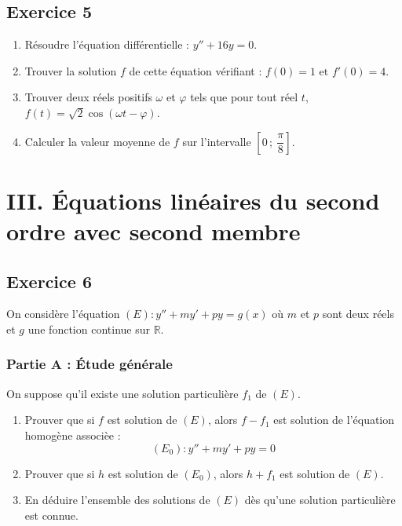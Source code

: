 \documentclass[12pt,a4paper]{article}
\begin{document}
\subsection*{Exercice 5}
\begin{enumerate}
    \item Résoudre l'équation différentielle : $y'' + 16y = 0.$
    \item Trouver la solution $f$ de cette équation vérifiant : $f(0) = 1 \text{ et } f'(0) = 4.$
    \item Trouver deux réels positifs $\omega$ et $\varphi$ tels que pour tout réel $t$, $f(t) = \sqrt{2} \cos(\omega t - \varphi)$.
    \item Calculer la valeur moyenne de $f$ sur l'intervalle $\left[0\,;\ \dfrac{\pi}{8}\right]$.
\end{enumerate}


\section*{III. Équations linéaires du second ordre avec second membre}

\subsection*{Exercice 6}
On considère l'équation $(E) : y'' + my' + py = g(x)$ où $m$ et $p$ sont deux réels et $g$ une fonction continue sur $\mathbb{R}$.

\subsubsection*{Partie A : Étude générale}
On suppose qu'il existe une solution particulière $f_{1}$ de $(E)$.
\begin{enumerate}
    \item Prouver que si $f$ est solution de $(E)$, alors $f - f_{1}$ est solution de l'équation homogène associèe :
    \[ (E_{0}) : y'' + my' + py = 0 \]
    \item Prouver que si $h$ est solution de $(E_{0})$, alors $h + f_{1}$ est solution de $(E)$.
    \item En déduire l'ensemble des solutions de $(E)$ dès qu'une solution particulière est connue.
\end{enumerate}
\end{document}
